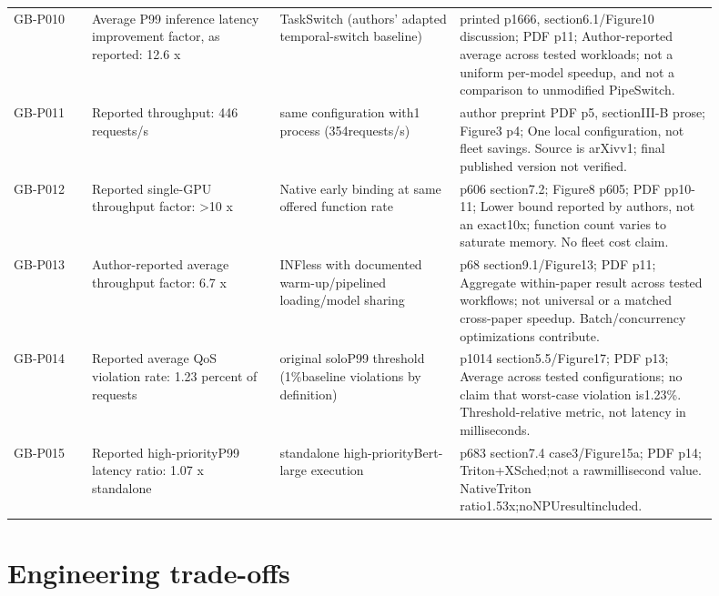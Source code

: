 {\begin{longtable}{>{\raggedright\arraybackslash}p{0.1\linewidth}>{\raggedright\arraybackslash}p{0.24\linewidth}>{\raggedright\arraybackslash}p{0.23\linewidth}>{\raggedright\arraybackslash}p{0.33\linewidth}}
GB-P010 & Average P99 inference latency improvement factor, as reported:\allowbreak{} 12.6 x & TaskSwitch (authors' adapted temporal-switch baseline) & printed p1666, section6.1/\allowbreak{}Figure10 discussion; PDF p11; Author-reported average across tested workloads; not a uniform per-model speedup, and not a comparison to unmodified PipeSwitch.\\
GB-P011 & Reported throughput:\allowbreak{} 446 requests/\allowbreak{}s & same configuration with1 process (354requests/\allowbreak{}s) & author preprint PDF p5, sectionIII-B prose; Figure3 p4; One local configuration, not fleet savings. Source is arXivv1; final published version not verified.\\
GB-P012 & Reported single-GPU throughput factor:\allowbreak{} >10 x & Native early binding at same offered function rate & p606 section7.2; Figure8 p605; PDF pp10-11; Lower bound reported by authors, not an exact10x; function count varies to saturate memory. No fleet cost claim.\\
GB-P013 & Author-reported average throughput factor:\allowbreak{} 6.7 x & INFless with documented warm-up/\allowbreak{}pipelined loading/\allowbreak{}model sharing & p68 section9.1/\allowbreak{}Figure13; PDF p11; Aggregate within-paper result across tested workflows; not universal or a matched cross-paper speedup. Batch/\allowbreak{}concurrency optimizations contribute.\\
GB-P014 & Reported average QoS violation rate:\allowbreak{} 1.23 percent of requests & original soloP99 threshold (1\%baseline violations by definition) & p1014 section5.5/\allowbreak{}Figure17; PDF p13; Average across tested configurations; no claim that worst-case violation is1.23\%. Threshold-relative metric, not latency in milliseconds.\\
GB-P015 & Reported high-priorityP99 latency ratio:\allowbreak{} 1.07 x standalone & standalone high-priorityBert-large execution & p683 section7.4 case3/\allowbreak{}Figure15a; PDF p14; Triton+XSched;not a rawmillisecond value. NativeTriton ratio1.53x;noNPUresultincluded.\\
\bottomrule
\end{longtable}}


\section{Engineering trade-offs}


